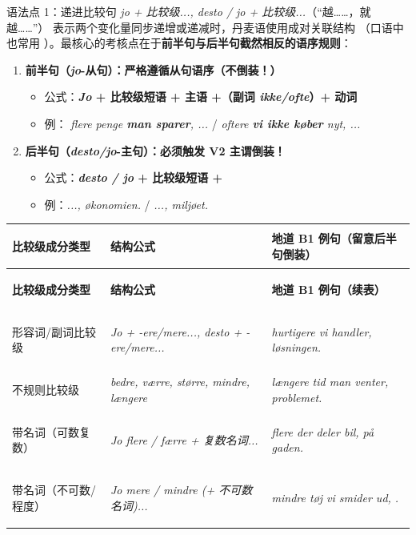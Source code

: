 \begin{grammatikbox}{语法点 1：递进比较句 \textit{jo + 比较级..., desto / jo + 比较级...}（“越……，就越……”）}
表示两个变化量同步递增或递减时，丹麦语使用成对关联结构 （口语中也常用 ）。最核心的考核点在于\textbf{前半句与后半句截然相反的语序规则}：
\begin{enumerate}
  \item \textbf{前半句（\textit{jo}-从句）：严格遵循从句语序（不倒装！）}
    \begin{itemize}
      \item 公式：\textbf{\textit{Jo} + 比较级短语 + 主语 +（副词 \textit{ikke/ofte}）+ 动词}
      \item 例：\textit{ flere penge \textbf{man sparer}, ...} / \textit{ oftere \textbf{vi ikke køber} nyt, ...}
    \end{itemize}
  \item \textbf{后半句（\textit{desto/jo}-主句）：必须触发 V2 主谓倒装！}
    \begin{itemize}
      \item 公式：\textbf{\textit{desto / jo} + 比较级短语 + }
      \item 例：\textit{...,  økonomien.} / \textit{...,  miljøet.}
    \end{itemize}
\end{enumerate}
\end{grammatikbox}

\vspace{0.25em}
\renewcommand{\arraystretch}{1.24}
{\small
\begin{xltabular}{\linewidth}{@{} >{\bfseries\color{NCDNavy}\raggedright\arraybackslash}p{3.4cm} >{\raggedright\arraybackslash}p{4.3cm} >{\raggedright\arraybackslash}X @{}}
\toprule
\textbf{比较级成分类型} & \textbf{结构公式} & \textbf{地道 B1 例句（留意后半句倒装）} \\
\midrule
\endfirsthead
\toprule
\textbf{比较级成分类型} & \textbf{结构公式} & \textbf{地道 B1 例句（续表）} \\
\midrule
\endhead
\bottomrule
\endfoot
形容词/副词比较级 & \textit{Jo + -ere/mere..., desto + -ere/mere...} & \textit{ hurtigere vi handler,  løsningen.} \\
不规则比较级 & \textit{bedre, værre, større, mindre, længere} & \textit{ længere tid man venter,  problemet.} \\
带名词（可数复数） & \textit{Jo flere / færre + 复数名词...} & \textit{ flere der deler bil,  på gaden.} \\
带名词（不可数/程度） & \textit{Jo mere / mindre (+ 不可数名词)...} & \textit{ mindre tøj vi smider ud, .} \\
\end{xltabular}
}

